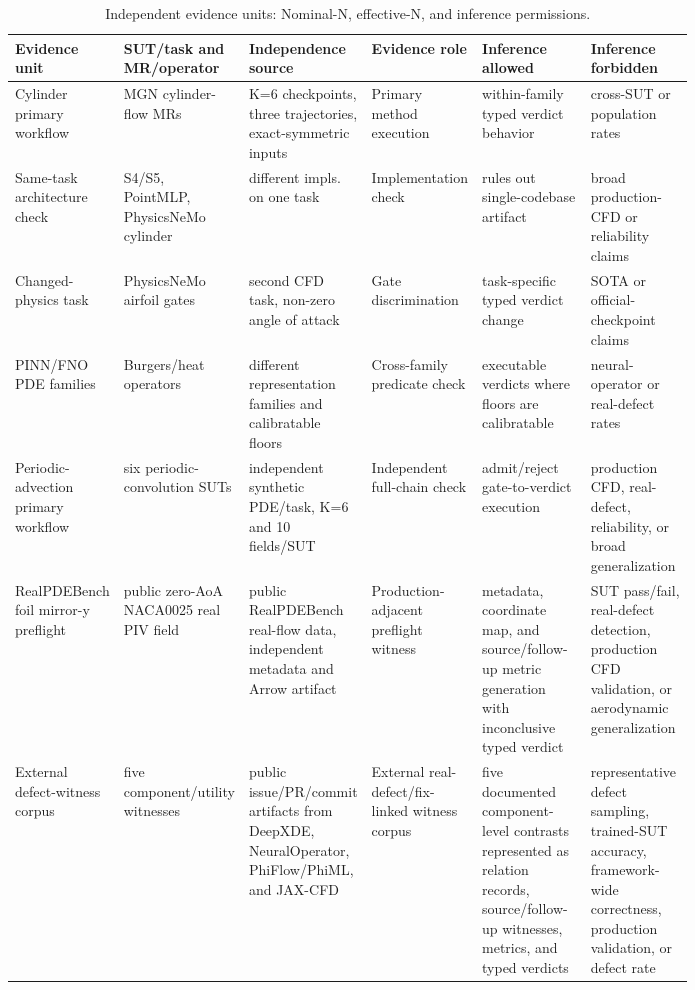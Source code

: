 \begin{table}[!htbp]
\centering
\caption{Independent evidence units: Nominal-N, effective-N, and inference permissions.}
\label{tab:effective-n-supp}
\scriptsize
\renewcommand{\arraystretch}{0.9}
\setlength{\tabcolsep}{1.5pt}
\begin{tabularx}{\linewidth}{@{}>{\raggedright\arraybackslash}p{0.14\linewidth}>{\raggedright\arraybackslash}p{0.17\linewidth}>{\raggedright\arraybackslash}p{0.16\linewidth}>{\raggedright\arraybackslash}p{0.16\linewidth}>{\raggedright\arraybackslash}p{0.16\linewidth}Y@{}}
\toprule
\textbf{Evidence unit} & \textbf{SUT/task and MR/operator} & \textbf{Independence source} & \textbf{Evidence role} & \textbf{Inference allowed} & \textbf{Inference forbidden} \\
\midrule
Cylinder primary workflow & MGN cylinder-flow MRs & K=6 checkpoints, three trajectories, exact-symmetric inputs & Primary method execution & within-family typed verdict behavior & cross-SUT or population rates \\
Same-task architecture check & S4/S5, PointMLP, PhysicsNeMo cylinder & different impls. on one task & Implementation check & rules out single-codebase artifact & broad production-CFD or reliability claims \\
Changed-physics task & PhysicsNeMo airfoil gates & second CFD task, non-zero angle of attack & Gate discrimination & task-specific typed verdict change & SOTA or official-checkpoint claims \\
PINN/FNO PDE families & Burgers/heat operators & different representation families and calibratable floors & Cross-family predicate check & executable verdicts where floors are calibratable & neural-operator or real-defect rates \\
Periodic-advection primary workflow & six periodic-convolution SUTs & independent synthetic PDE/task, K=6 and 10 fields/SUT & Independent full-chain check & admit/reject gate-to-verdict execution & production CFD, real-defect, reliability, or broad generalization \\
RealPDEBench foil mirror-y preflight & public zero-AoA NACA0025 real PIV field & public RealPDEBench real-flow data, independent metadata and Arrow artifact & Production-adjacent preflight witness & metadata, coordinate map, and source/follow-up metric generation with inconclusive typed verdict & SUT pass/fail, real-defect detection, production CFD validation, or aerodynamic generalization \\
External defect-witness corpus & five component/utility witnesses & public issue/PR/commit artifacts from DeepXDE, NeuralOperator, PhiFlow/PhiML, and JAX-CFD & External real-defect/fix-linked witness corpus & five documented component-level contrasts represented as relation records, source/follow-up witnesses, metrics, and typed verdicts & representative defect sampling, trained-SUT accuracy, framework-wide correctness, production validation, or defect rate \\

\end{tabularx}
\end{table}
